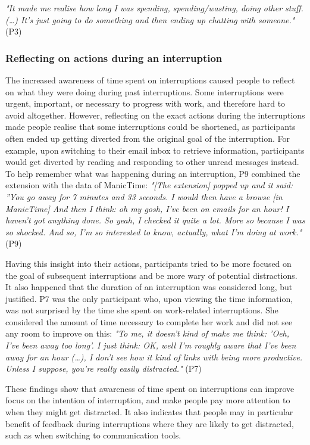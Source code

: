 \textit{"It made me realise how long I was spending, spending/wasting, doing other stuff. (…)  It’s just going to do something and then ending up chatting with someone."} (P3)

\subsubsection{Reflecting on actions during an interruption}
The increased awareness of time spent on interruptions caused people to reflect on what they were doing during past interruptions. Some interruptions were urgent, important, or necessary to progress with work, and therefore hard to avoid altogether. However, reflecting on the exact actions during the interruptions made people realise that some interruptions could be shortened, as participants often ended up getting diverted from the original goal of the interruption. For example, upon switching to their email inbox to retrieve information, participants would get diverted by reading and responding to other unread messages instead. To help remember what was happening during an interruption, P9 combined the extension with the data of ManicTime: \textit{"[The extension] popped up and it said: ”You go away for 7 minutes and 33 seconds. I would then have a browse [in ManicTime] And then I think: oh my gosh, I've been on emails for an hour! I haven't got anything done. So yeah, I checked it quite a lot. More so because I was so shocked. And so, I'm so interested to know, actually, what I'm doing at work."} (P9)

Having this insight into their actions, participants tried to be more focused on the goal of subsequent interruptions and be more wary of potential distractions. It also happened that the duration of an interruption was considered long, but justified. P7 was the only participant who, upon viewing the time information, was not surprised by the time she spent on work-related interruptions. She considered the amount of time necessary to complete her work and did not see any room to improve on this: \textit{"To me, it doesn't kind of make me think: 'Oeh, I've been away too long'. I just think: OK, well I'm roughly aware that I've been away for an hour (…), I don't see how it kind of links with being more productive. Unless I suppose, you're really easily distracted."} (P7)

These findings show that awareness of time spent on interruptions can improve focus on the intention of interruption, and make people pay more attention to when they might get distracted. It also indicates that people may in particular benefit of feedback during interruptions where they are likely to get distracted, such as when switching to communication tools. 

